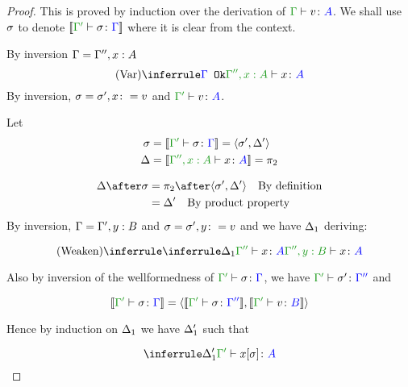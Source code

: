 \documentclass{report}
\begin{document}
\begin{framed}
    \begin{proof}
        This is proved by induction over the derivation of $\typerelation{\G}{v}{A}$.
        We shall use $\sigma$ to denote $\deno{\typerelation{\G'}{\si}{\G}}$ where it is clear from the context.
        
        \case{\vvar}
        By inversion $\Gamma = \Gamma'', x:A$
        \begin{equation}
            \ntreeruleI{\vvar}{\ok{\G}}{\typerelation{\G'', x:A}{x}{A}}
        \end{equation}
        By inversion, $\sigma = \sigma', x\colon= v$ and $\typerelation{\G'}{v}{A}$.
        
        Let 
        \begin{align*}
            \si &=\deno{\typerelation{\G'}{\si}{\G}} = \pr{\si'}{\D'}\\
            \D &=\deno{\typerelation{\G'', x:A}{x}{A}} = \pp\\
        \end{align*}
        
        \begin{align*}
            \D\after\si &= \pp\after\pr{\si'}{\D'}\qt{By definition}\\
            &= \D'\qt{By product property}
        \end{align*}
        \case{\vweaken}
        By inversion, $\Gamma = \Gamma', y:B$ and $\sigma = \sigma', y\colon= v$
        and we have $\Delta_1$ deriving:
        
        \begin{equation}
            \ntreeruleI{\vweaken}{\treeruleI{\D_1}{\typerelation{\G''}{x}{A}}}{\typerelation{\G'',y: B}{x}{A}}
        \end{equation}
        
        Also by inversion of the wellformedness of $\typerelation{\G'}{\si}{\G}$, we have $\typerelation{\G'}{\si'}{\G''}$ and 
        
        \begin{equation}
            \deno{\typerelation{\G'}{\si}{\G}} = \pr{\deno{\typerelation{\G'}{\si}{\G''}}}{\deno{\typerelation{\G'}{v}{B}}}
        \end{equation}
        
        Hence by induction on $\Delta_1$ we have $\Delta_1'$ such that
        
        \begin{equation}
            \treeruleI{\D_1'}{\typerelation{\G'}{x\ssi}{A}}
        \end{equation}
        

\end{proof}
\end{framed}
\end{document}
